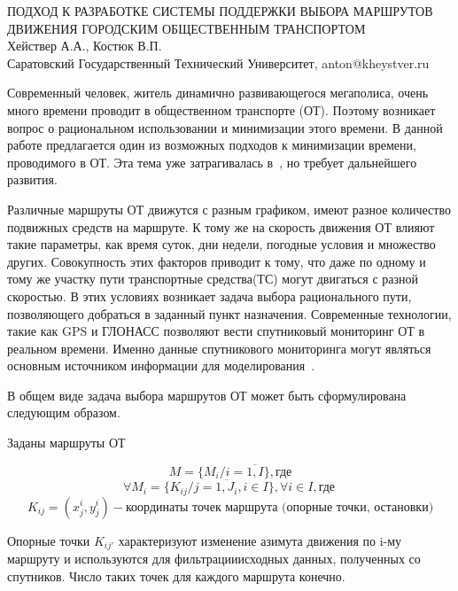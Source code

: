 \documentclass[a4paper,13pt]{article}
\begin{document}
\begin{center} %
    \large ПОДХОД К РАЗРАБОТКЕ СИСТЕМЫ ПОДДЕРЖКИ ВЫБОРА МАРШРУТОВ ДВИЖЕНИЯ ГОРОДСКИМ ОБЩЕСТВЕННЫМ ТРАНСПОРТОМ\\
    \large Хействер А.А., Костюк В.П.\\
    \large Саратовский Государственный Технический Университет, anton@kheystver.ru
\end{center} %
\thispagestyle{empty} %
Современный человек, житель динамично развивающегося мегаполиса, очень много времени проводит в общественном транспорте (ОТ). Поэтому возникает вопрос о рациональном использовании и минимизации этого времени. В данной работе предлагается один из возможных подходов к минимизации времени, проводимого в ОТ. Эта тема уже затрагивалась в~\cite{kheystver}, но требует дальнейшего развития.

Различные маршруты ОТ движутся с разным графиком, имеют разное количество подвижных средств на маршруте. К тому же на скорость движения ОТ влияют такие параметры, как время суток, дни недели, погодные условия и множество других. Совокупность этих факторов приводит к тому, что даже по одному и тому же участку пути транспортные средства(ТС) могут двигаться с разной скоростью. В этих условиях возникает задача выбора рационального пути, позволяющего добраться в заданный пункт назначения. Современные технологии, такие как GPS и ГЛОНАСС позволяют вести спутниковый мониторинг ОТ в реальном времени. Именно данные спутникового мониторинга могут являться основным источником информации для моделирования~\cite{math}.

В общем виде задача выбора маршрутов ОТ может быть сформулирована следующим образом.

Заданы маршруты ОТ

\begin{equation}\label{eq:marshruts}
M = \{ M_i/i= \overline{1,I} \}, \text{где}
\end{equation}
\begin{equation}\label{eq:stops}
\forall M_i = \{ K_{ij}/j = \overline{1,J_i}, i \in I \}, \forall i \in I, \text{где}\ 
\end{equation}
\begin{equation}\label{eq:points}
K_{ij} = (x^i_j, y^i_j) - \text{координаты точек маршрута (опорные точки, остановки)}
\end{equation}

Опорные точки \begin{math}K_{ij'}\end{math} характеризуют изменение азимута движения по i-му маршруту и используются для фильтрацииисходных данных, полученных со спутников. Число таких точек для каждого маршрута конечно.
\end{document}
